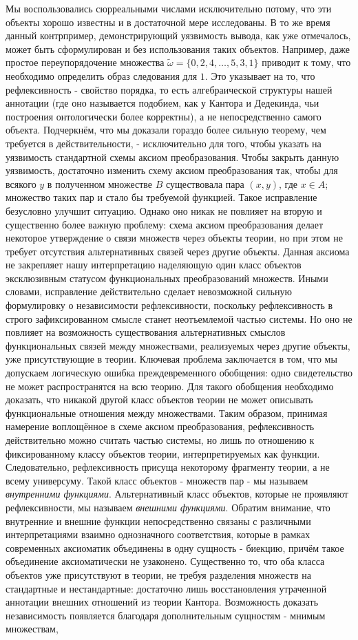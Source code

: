 \documentclass[12pt]{article}
\begin{document}
Мы воспользовались сюрреальными числами исключительно потому, что эти объекты хорошо известны и в достаточной мере исследованы. В то же время данный контрпример, демонстрирующий уязвимость вывода, как уже отмечалось, может быть сформулирован и без использования таких объектов. Например, даже простое переупорядочение множества $\tilde{\omega} = \{ 0, 2, 4, \dots, 5, 3, 1 \}$ приводит к тому, что необходимо определить образ следования для $1$. Это указывает на то, что рефлексивность - свойство порядка, то есть алгебраической структуры нашей аннотации (где оно называется подобием, как у Кантора и Дедекинда, чьи построения онтологически более корректны), а не непосредственно самого объекта. Подчеркнём, что мы доказали гораздо более сильную теорему, чем требуется в действительности, - исключительно для того, чтобы указать на уязвимость стандартной схемы аксиом преобразования. Чтобы закрыть данную уязвимость, достаточно изменить схему аксиом преобразования так, чтобы для всякого $y$ в полученном множестве $B$ существовала пара $(x, y)$, где $x \in A$; множество таких пар и стало бы требуемой функцией. Такое исправление безусловно улучшит ситуацию. Однако оно никак не повлияет на вторую и существенно более важную проблему: схема аксиом преобразования делает некоторое утверждение о связи множеств через объекты теории, но при этом не требует отсутствия альтернативных связей через другие объекты. Данная аксиома не закрепляет нашу интерпретацию наделяющую один класс объектов эксклюзивным статусом функциональных преобразований множеств. Иными словами, исправление действительно сделает невозможной сильную формулировку о независимости рефлексивности, поскольку рефлексивность в строго зафиксированном смысле станет неотъемлемой частью системы. Но оно не повлияет на возможность существования альтернативных смыслов функциональных связей между множествами, реализуемых через другие объекты, уже присутствующие в теории. Ключевая проблема заключается в том, что мы допускаем логическую ошибка преждевременного обобщения: одно свидетельство не может распространятся на всю теорию. Для такого обобщения необходимо доказать, что никакой другой класс объектов теории не может описывать функциональные отношения между множествами. Таким образом, принимая намерение воплощённое в схеме аксиом преобразования, рефлексивность действительно можно считать частью системы, но лишь по отношению к фиксированному классу объектов теории, интерпретируемых как функции. Следовательно, рефлексивность присуща некоторому фрагменту теории, а не всему универсуму. Такой класс объектов - множеств пар - мы называем {\it внутренними функциями}. Альтернативный класс объектов, которые не проявляют рефлексивности, мы называем {\it внешними функциями}. Обратим внимание, что внутренние и внешние функции непосредственно связаны с различными интерпретациями взаимно однозначного соответствия, которые в рамках современных аксиоматик объединены в одну сущность - биекцию, причём такое объединение аксиоматически не узаконено. Существенно то, что оба класса объектов уже присутствуют в теории, не требуя разделения множеств на стандартные и нестандартные: достаточно лишь восстановления утраченной аннотации внешних отношений из теории Кантора. Возможность доказать независимость появляется благодаря дополнительным сущностям - мнимым множествам, 
\end{document}
